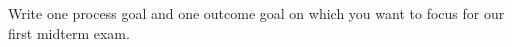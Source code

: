 %
%

\noindent{}Write one process goal and one outcome goal on which you want to focus for our first midterm exam.